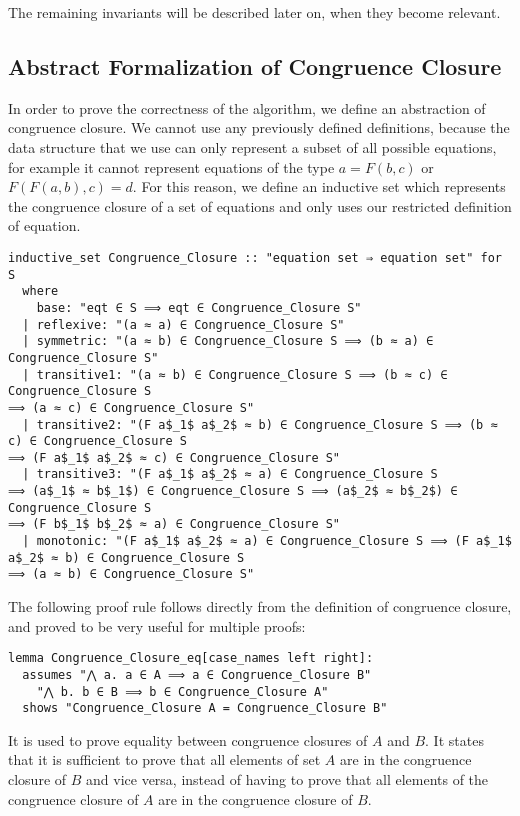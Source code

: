 The remaining invariants will be described later on, when they become relevant.

\subsection{Abstract Formalization of Congruence Closure}
\label{subsection:abstraction}

In order to prove the correctness of the algorithm, we define an abstraction of congruence closure. We cannot use any previously defined definitions, because the data structure that we use can only represent a subset of all possible equations, for example it cannot represent equations of the type $a = F(b, c)$ or $F (F (a, b), c) = d$. For this reason, we define an inductive set which represents the congruence closure of a set of equations and only uses our restricted definition of equation.

\begin{lstlisting}
inductive_set Congruence_Closure :: "equation set ⇒ equation set" for S
  where
    base: "eqt ∈ S ⟹ eqt ∈ Congruence_Closure S"
  | reflexive: "(a ≈ a) ∈ Congruence_Closure S"
  | symmetric: "(a ≈ b) ∈ Congruence_Closure S ⟹ (b ≈ a) ∈ Congruence_Closure S"
  | transitive1: "(a ≈ b) ∈ Congruence_Closure S ⟹ (b ≈ c) ∈ Congruence_Closure S
⟹ (a ≈ c) ∈ Congruence_Closure S"
  | transitive2: "(F a$_1$ a$_2$ ≈ b) ∈ Congruence_Closure S ⟹ (b ≈ c) ∈ Congruence_Closure S
⟹ (F a$_1$ a$_2$ ≈ c) ∈ Congruence_Closure S"
  | transitive3: "(F a$_1$ a$_2$ ≈ a) ∈ Congruence_Closure S
⟹ (a$_1$ ≈ b$_1$) ∈ Congruence_Closure S ⟹ (a$_2$ ≈ b$_2$) ∈ Congruence_Closure S
⟹ (F b$_1$ b$_2$ ≈ a) ∈ Congruence_Closure S"
  | monotonic: "(F a$_1$ a$_2$ ≈ a) ∈ Congruence_Closure S ⟹ (F a$_1$ a$_2$ ≈ b) ∈ Congruence_Closure S
⟹ (a ≈ b) ∈ Congruence_Closure S"
\end{lstlisting}

The following proof rule follows directly from the definition of congruence closure, and proved to be very useful for multiple proofs:

\begin{lstlisting}
lemma Congruence_Closure_eq[case_names left right]:
  assumes "⋀ a. a ∈ A ⟹ a ∈ Congruence_Closure B"
    "⋀ b. b ∈ B ⟹ b ∈ Congruence_Closure A"
  shows "Congruence_Closure A = Congruence_Closure B"
\end{lstlisting}

It is used to prove equality between congruence closures of $A$ and $B$. It states that it is sufficient to prove that all elements of set $A$ are in the congruence closure of $B$ and vice versa, instead of having to prove that all elements of the congruence closure of $A$ are in the congruence closure of $B$.

